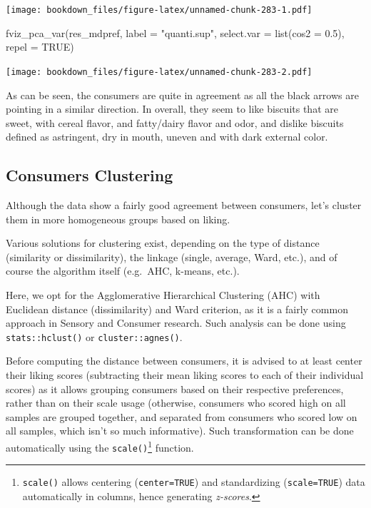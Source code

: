 \documentclass[
]{krantz}
\makeatletter
\newenvironment{Shaded}{\begin{snugshade}}{\end{snugshade}}
\newcommand{\AttributeTok}[1]{\textcolor[rgb]{0.61,0.61,0.61}{#1}}
\newcommand{\ConstantTok}[1]{\textcolor[rgb]{0,0,0}{#1}}
\newcommand{\FloatTok}[1]{\textcolor[rgb]{0.06,0.06,0.06}{#1}}
\newcommand{\FunctionTok}[1]{\textcolor[rgb]{0,0,0}{#1}}
\newcommand{\NormalTok}[1]{#1}
\newcommand{\StringTok}[1]{\textcolor[rgb]{0.5,0.5,0.5}{#1}}
\renewenvironment{quote}{\begin{VF}}{\end{VF}}
\newenvironment{kframe}{%
\medskip{}
\setlength{\fboxsep}{.8em}
 \def\at@end@of@kframe{}%
 \ifinner\ifhmode%
  \def\at@end@of@kframe{\end{minipage}}%
  \begin{minipage}{\columnwidth}%
 \fi\fi%
 \def\FrameCommand##1{\hskip\@totalleftmargin \hskip-\fboxsep
 \colorbox{shadecolor}{##1}\hskip-\fboxsep
     \hskip-\linewidth \hskip-\@totalleftmargin \hskip\columnwidth}%
 \MakeFramed {\advance\hsize-\width
   \@totalleftmargin\z@ \linewidth\hsize
   \@setminipage}}%
 {\par\unskip\endMakeFramed%
 \at@end@of@kframe}
\renewenvironment{Shaded}{\begin{kframe}}{\end{kframe}}
\makeatother
\begin{document}
\texttt{[image: bookdown\_files/figure-latex/unnamed-chunk-283-1.pdf]}

\begin{Shaded}
\begin{Highlighting}[]
\FunctionTok{fviz\_pca\_var}\NormalTok{(res\_mdpref, }\AttributeTok{label =} \StringTok{"quanti.sup"}\NormalTok{, }
             \AttributeTok{select.var =} \FunctionTok{list}\NormalTok{(}\AttributeTok{cos2 =} \FloatTok{0.5}\NormalTok{), }\AttributeTok{repel =} \ConstantTok{TRUE}\NormalTok{)}
\end{Highlighting}
\end{Shaded}

\texttt{[image: bookdown\_files/figure-latex/unnamed-chunk-283-2.pdf]}

As can be seen, the consumers are quite in agreement as all the black arrows are pointing in a similar direction.
In overall, they seem to like biscuits that are sweet, with cereal flavor, and fatty/dairy flavor and odor, and dislike biscuits defined as astringent, dry in mouth, uneven and with dark external color.

\hypertarget{hac}{%
\subsection{Consumers Clustering}\label{hac}}

Although the data show a fairly good agreement between consumers, let's cluster them in more homogeneous groups based on liking.

Various solutions for clustering exist, depending on the type of distance (similarity or dissimilarity), the linkage (single, average, Ward, etc.), and of course the algorithm itself (e.g.~AHC, k-means, etc.).

Here, we opt for the Agglomerative Hierarchical Clustering (AHC) with Euclidean distance (dissimilarity) and Ward criterion, as it is a fairly common approach in Sensory and Consumer research. Such analysis can be done using \texttt{stats::hclust()} or \texttt{cluster::agnes()}.

\begin{quote}
Before computing the distance between consumers, it is advised to at least center their liking scores (subtracting their mean liking scores to each of their individual scores) as it allows grouping consumers based on their respective preferences, rather than on their scale usage (otherwise, consumers who scored high on all samples are grouped together, and separated from consumers who scored low on all samples, which isn't so much informative). Such transformation can be done automatically using the \texttt{scale()}\footnote{\texttt{scale()} allows centering (\texttt{center=TRUE}) and standardizing (\texttt{scale=TRUE}) data automatically in columns, hence generating \emph{z-scores}.} function.
\end{quote}
\end{document}
